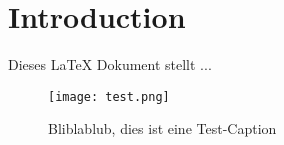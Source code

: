 \section{Introduction}
\label{sec:Introduction}

Dieses LaTeX Dokument stellt ... \cite{CitekeyArticle}
\\

\begin{figure}[h]
\centering
\texttt{[image: test.png]}
\caption{Bliblablub, dies ist eine Test-Caption}
\end{figure}